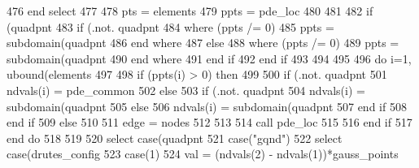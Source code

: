 \begin{DoxyCode}
476 \textcolor{keywordflow}{            end select}
477               
478             pts = elements%
479             ppts = pde\_loc%
480             
481                 
482             \textcolor{keywordflow}{if} (quadpnt%
483               \textcolor{keywordflow}{if} (.not. quadpnt%
484                 \textcolor{keywordflow}{where} (ppts /= 0)
485                   ppts = subdomain(quadpnt%
486 \textcolor{keywordflow}{                end where}
487               \textcolor{keywordflow}{else} 
488                 \textcolor{keywordflow}{where} (ppts /= 0)
489                   ppts = subdomain(quadpnt%
490 \textcolor{keywordflow}{                end where}
491 \textcolor{keywordflow}{              end if}
492 \textcolor{keywordflow}{            end if}
493 
494 
495             
496             \textcolor{keywordflow}{do} i=1, ubound(elements%
497         
498               \textcolor{keywordflow}{if} (ppts(i) > 0) \textcolor{keywordflow}{then}
499 
500                 \textcolor{keywordflow}{if} (.not. quadpnt%
501                   ndvals(i) = pde_common%
502                 \textcolor{keywordflow}{else}
503                   \textcolor{keywordflow}{if} (.not. quadpnt%
504                     ndvals(i) = subdomain(quadpnt%
505 \textcolor{comment}{                  }\textcolor{keywordflow}{else}
506                     ndvals(i) = subdomain(quadpnt%
507 \textcolor{comment}{}\textcolor{keywordflow}{                  end if}
508 \textcolor{keywordflow}{                end if}
509               \textcolor{keywordflow}{else}
510 
511                 edge = nodes%
512 
513                 
514                 \textcolor{keyword}{call }pde\_loc%
515                 
516 \textcolor{keywordflow}{              end if}
517 \textcolor{keywordflow}{            end do}
518 
519        
520             \textcolor{keywordflow}{select case}(quadpnt%
521               \textcolor{keywordflow}{case}(\textcolor{stringliteral}{"gqnd"})
522                 \textcolor{keywordflow}{select case}(drutes_config%
523                   \textcolor{keywordflow}{case}(1)
524                     val = (ndvals(2) - ndvals(1))*gauss_points%

\end{DoxyCode}
